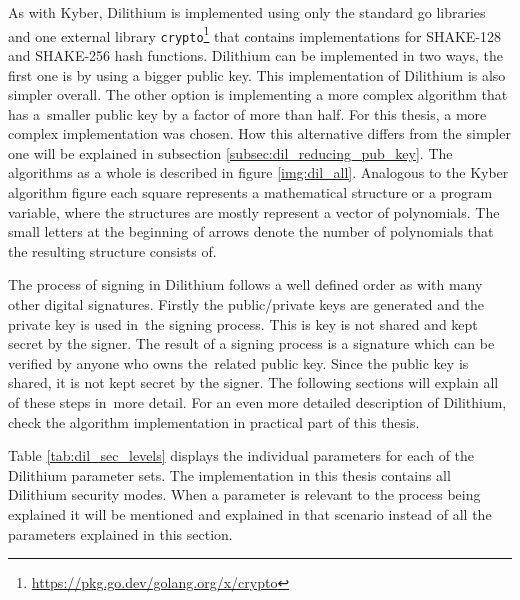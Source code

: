 As with Kyber, Dilithium is implemented using only the standard go libraries and one external library \texttt{crypto}\footnote{\url{https://pkg.go.dev/golang.org/x/crypto}} that contains implementations for SHAKE-128 and SHAKE-256 hash functions. Dilithium can be implemented in two ways, the first one is by using a bigger public key. This implementation of Dilithium is also simpler overall. The other option is implementing a more complex algorithm that has a~smaller public key by a factor of more than half. For this thesis, a more complex implementation was chosen. How this alternative differs from the simpler one will be explained in subsection \ref{subsec:dil_reducing_pub_key}. The algorithms as a whole is described in figure \ref{img:dil_all}. Analogous to the Kyber algorithm figure each square represents a mathematical structure or a program variable, where the structures are mostly represent a vector of polynomials. The small letters at the beginning of arrows denote the number of polynomials that the resulting structure consists of.

The process of signing in Dilithium follows a well defined order as with many other digital signatures. Firstly the public/private keys are generated and the private key is used in~the signing process. This is key is not shared and kept secret by the signer. The result of a signing process is a signature which can be verified by anyone who owns the~related public key. Since the public key is shared, it is not kept secret by the signer. The following sections will explain all of these steps in~more detail. For an even more detailed description of Dilithium, check the algorithm implementation in practical part of this thesis.


Table \ref{tab:dil_sec_levels} displays the individual parameters for each of the Dilithium parameter sets. The implementation in this thesis contains all Dilithium security modes. When a parameter is relevant to the process being explained it will be mentioned and explained in that scenario instead of all the parameters explained in this section.
